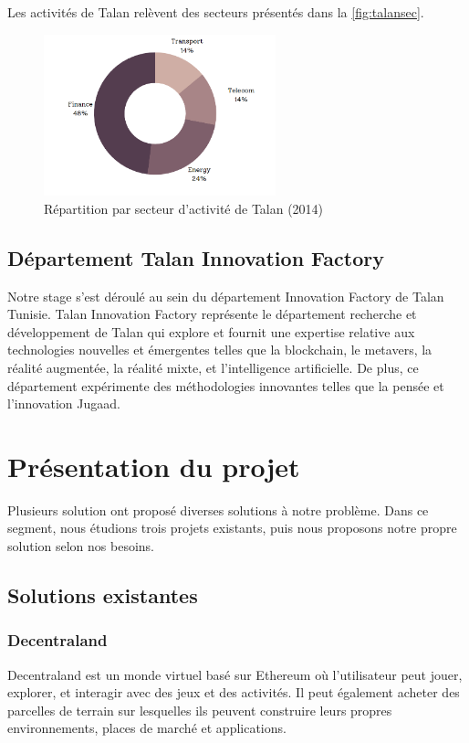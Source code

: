 \documentclass[12pt,a4paper,oneside,french]{book}
\begin{document}
Les activités de Talan relèvent des secteurs présentés dans la \autoref{fig:talansec}.
\begin{figure}[H]
    \centering
    \includegraphics[width=0.6\textwidth]{figure/talansec.png}
    \caption{Répartition par secteur d'activité de Talan (2014)}
    \label{fig:talansec}
\end{figure}
\noindent

\subsection{Département Talan Innovation Factory}
Notre stage s'est déroulé au sein du département Innovation Factory de Talan Tunisie. Talan Innovation Factory représente le département recherche et développement de Talan qui explore et fournit une expertise relative aux technologies nouvelles et émergentes telles que la blockchain, le metavers, la réalité augmentée, la réalité mixte, et l'intelligence artificielle. \newline
De plus, ce département expérimente des méthodologies innovantes telles que la pensée et l'innovation Jugaad.


\section{Présentation du projet}
Plusieurs solution ont proposé diverses solutions à notre problème. Dans ce segment, nous
étudions trois projets existants, puis nous proposons notre propre solution selon nos besoins.
\subsection{Solutions existantes}
\subsubsection*{Decentraland}
Decentraland \cite{decentraland} est un monde virtuel basé sur Ethereum où l'utilisateur peut jouer, explorer,
et interagir avec des jeux et des activités. Il peut également acheter des parcelles de terrain sur lesquelles ils peuvent construire leurs propres environnements, places de marché et applications.
\end{document}

